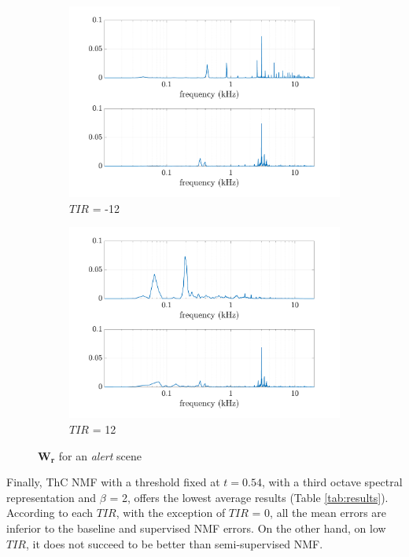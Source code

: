 \documentclass[twocolumn,a4paper,10pt]{article}
\begin{document}
\begin{figure}
    \centering
    \begin{subfigure}[t]{0.45\textwidth}
        \centering
        \includegraphics[width=\linewidth]{../image/Y_alert_TPR_-12_01.pdf}
        \caption{$TIR$ = -12}
        \label{fig:Y_alert-12}
    \end{subfigure}%
    \hfill
    \begin{subfigure}[t]{0.45\textwidth}
        \centering
        \includegraphics[width=\linewidth]{../image/Y_alert_TPR_12_01.pdf}
        \caption{$TIR$ = 12}
		\label{fig:Y_alert_12}
    \end{subfigure}
    \caption{$\mathbf{W_r}$ for an \textit{alert} scene}
\end{figure}


Finally, ThC NMF with a threshold fixed at $t = 0.54$, with a third octave spectral representation and $\beta$ = 2,  offers the lowest average results (Table \ref{tab:results}). According to each $TIR$, with the exception of $TIR$ = 0, all the mean errors are inferior to the baseline and supervised NMF errors. On the other hand, on low $TIR$, it does not succeed to be better than semi-supervised NMF. 
\end{document}
